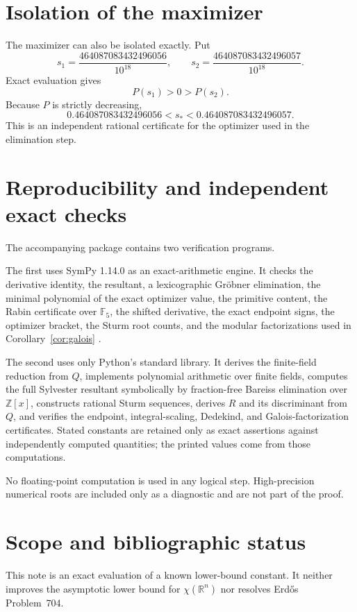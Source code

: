 \documentclass[11pt]{article}
\theoremstyle{remark}
\begin{document}
\section{Isolation of the maximizer}
The maximizer can also be isolated exactly. Put
\[
s_1=\frac{464087083432496056}{10^{18}},
\qquad
s_2=\frac{464087083432496057}{10^{18}}.
\]
Exact evaluation gives
\[
P(s_1)>0>P(s_2).
\]
Because \(P\) is strictly decreasing,
\[
0.464087083432496056<s_*<0.464087083432496057.
\]
This is an independent rational certificate for the optimizer used in the elimination step.

\section{Reproducibility and independent exact checks}
The accompanying package contains two verification programs.

The first uses SymPy 1.14.0 as an exact-arithmetic engine. It checks the derivative identity, the resultant, a lexicographic Gr\"obner elimination, the minimal polynomial of the exact optimizer value, the primitive content, the Rabin certificate over \(\mathbb F_5\), the shifted derivative, the exact endpoint signs, the optimizer bracket, the Sturm root counts, and the modular factorizations used in Corollary~\ref{cor:galois} \cite{SymPy2017}.

The second uses only Python's standard library. It derives the finite-field reduction from \(Q\), implements polynomial arithmetic over finite fields, computes the full Sylvester resultant symbolically by fraction-free Bareiss elimination over \(\mathbb Z[x]\), constructs rational Sturm sequences, derives \(R\) and its discriminant from \(Q\), and verifies the endpoint, integral-scaling, Dedekind, and Galois-factorization certificates. Stated constants are retained only as exact assertions against independently computed quantities; the printed values come from those computations.

No floating-point computation is used in any logical step. High-precision numerical roots are included only as a diagnostic and are not part of the proof.

\section{Scope and bibliographic status}
This note is an exact evaluation of a known lower-bound constant. It neither improves the asymptotic lower bound for \(\chi(\mathbb R^n)\) nor resolves Erd\H{o}s Problem~704.
\end{document}
